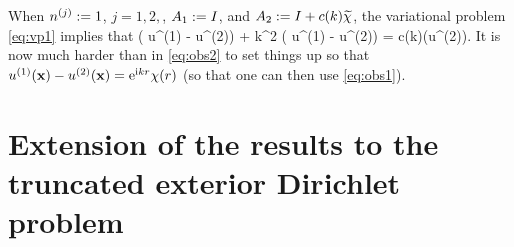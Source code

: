 When $n^{(j)}:=1$, $j=1,2,$, $A_{1}:=I$, and $A_{2}:= I + c(k)\widetilde{\chi}$, the variational problem \eqref{eq:vp1} implies that 
\beqs%
\Delta \big( u^{(1)} - u^{(2)}\big) + k^2 \big( u^{(1)} - u^{(2)}\big) = c(k)\nabla\cdot \big(\widetilde{\chi}\nabla u^{(2)}\big).
\eeqs
It is now much harder than in \eqref{eq:obs2} to set things up so that $ u^{(1)}(\mathbf{x}) - u^{(2)}(\mathbf{x})=\mathrm{e}^{\mathrm{i} kr}\chi(r)$ (so that one can then use \eqref{eq:obs1}).
\ere


\section{Extension of the results to the truncated exterior Dirichlet problem}\label{sec:TEDP}


